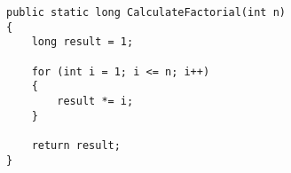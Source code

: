 \begin{lstlisting}
public static long CalculateFactorial(int n)
{
    long result = 1;
    
    for (int i = 1; i <= n; i++)
    {
        result *= i;
    }
    
    return result;
}
\end{lstlisting}